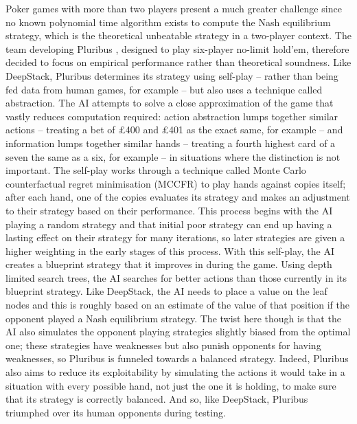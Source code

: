 \documentclass{article}
\begin{document}
\begin{multicols*}{2}
\newline
Poker games with more than two players present a much greater challenge since no known polynomial time algorithm exists to compute the Nash equilibrium strategy, which is the theoretical unbeatable strategy in a two-player context. The team developing Pluribus \cite{Pluribus}, designed to play six-player no-limit hold’em, therefore decided to focus on empirical performance rather than theoretical soundness. Like DeepStack, Pluribus determines its strategy using self-play – rather than being fed data from human games, for example – but also uses a technique called abstraction. The AI attempts to solve a close approximation of the game that vastly reduces computation required: action abstraction lumps together similar actions – treating a bet of £400 and £401 as the exact same, for example – and information lumps together similar hands – treating a fourth highest card of a seven the same as a six, for example – in situations where the distinction is not important.
\newline
The self-play works through a technique called Monte Carlo counterfactual regret minimisation (MCCFR) to play hands against copies itself; after each hand, one of the copies evaluates its strategy and makes an adjustment to their strategy based on their performance. This process begins with the AI playing a random strategy and that initial poor strategy can end up having a lasting effect on their strategy for many iterations, so later strategies are given a higher weighting in the early stages of this process. With this self-play, the AI creates a blueprint strategy that it improves in during the game.
\newline
Using depth limited search trees, the AI searches for better actions than those currently in its blueprint strategy. Like DeepStack, the AI needs to place a value on the leaf nodes and this is roughly based on an estimate of the value of that position if the opponent played a Nash equilibrium strategy. The twist here though is that the AI also simulates the opponent playing strategies slightly biased from the optimal one; these strategies have weaknesses but also punish opponents for having weaknesses, so Pluribus is funneled towards a balanced strategy. Indeed, Pluribus also aims to reduce its exploitability by simulating the actions it would take in a situation with every possible hand, not just the one it is holding, to make sure that its strategy is correctly balanced. And so, like DeepStack, Pluribus triumphed over its human opponents during testing.

\end{multicols*}
\end{document}
